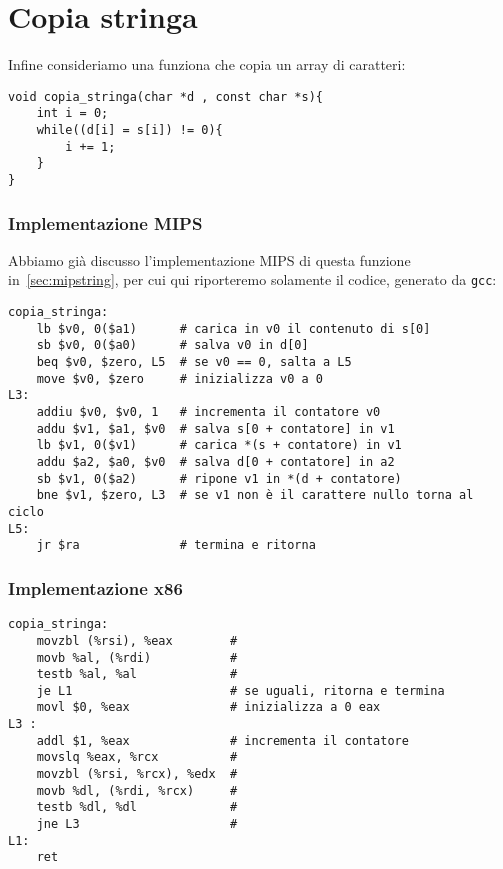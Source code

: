 \documentclass[class=book, crop=false, oneside]{standalone}
\begin{document}
\section{Copia stringa}
Infine consideriamo una funziona che copia un array di caratteri:
\begin{verbatim}
void copia_stringa(char *d , const char *s){
	int i = 0;
	while((d[i] = s[i]) != 0){
		i += 1;
	}
}
\end{verbatim}

\subsubsection{Implementazione MIPS}
Abbiamo già discusso l'implementazione MIPS di questa funzione in~\ref{sec:mipstring}, per cui qui riporteremo solamente il codice, generato da \texttt{gcc}:
\begin{verbatim}
copia_stringa:
	lb $v0, 0($a1)      # carica in v0 il contenuto di s[0]
	sb $v0, 0($a0)      # salva v0 in d[0]
	beq $v0, $zero, L5  # se v0 == 0, salta a L5
	move $v0, $zero     # inizializza v0 a 0
L3:
	addiu $v0, $v0, 1   # incrementa il contatore v0
	addu $v1, $a1, $v0  # salva s[0 + contatore] in v1
	lb $v1, 0($v1)      # carica *(s + contatore) in v1
	addu $a2, $a0, $v0  # salva d[0 + contatore] in a2
	sb $v1, 0($a2)      # ripone v1 in *(d + contatore)
	bne $v1, $zero, L3  # se v1 non è il carattere nullo torna al ciclo
L5:
	jr $ra              # termina e ritorna
\end{verbatim}

\subsubsection{Implementazione x86}

\begin{verbatim}
copia_stringa:
	movzbl (%rsi), %eax        #
	movb %al, (%rdi)           #
	testb %al, %al             #
	je L1                      # se uguali, ritorna e termina
	movl $0, %eax              # inizializza a 0 eax
L3 :
	addl $1, %eax              # incrementa il contatore
	movslq %eax, %rcx          #
	movzbl (%rsi, %rcx), %edx  #
	movb %dl, (%rdi, %rcx)     #
	testb %dl, %dl             #
	jne L3                     #
L1:
	ret
\end{verbatim}
\end{document}
